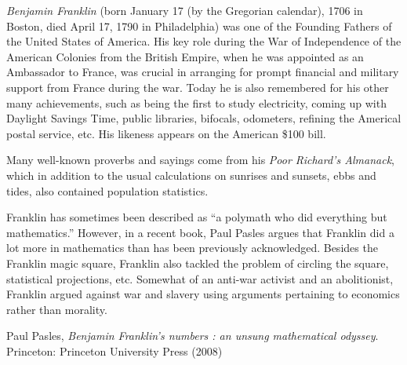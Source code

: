 \documentclass[12pt]{article}
\begin{document}
{\em Benjamin Franklin} (born January 17 (by the Gregorian calendar), 1706 in Boston, died April 17, 1790 in Philadelphia) was one of the Founding Fathers of the United States of America. His key role during the War of Independence of the American Colonies from the British Empire, when he was appointed as an Ambassador to France, was crucial in arranging for prompt financial and military support from France during the war.  Today he is also remembered for his other many achievements, such as being the first to study electricity, coming up with Daylight Savings Time, public libraries, bifocals, odometers, refining the Americal postal service, etc. His likeness appears on the American \$100 bill.

Many well-known proverbs and sayings come from his {\it Poor Richard's Almanack}, which in addition to the usual calculations on sunrises and sunsets, ebbs and tides, also contained population statistics.

Franklin has sometimes been described as ``a polymath who did everything but mathematics.'' However, in a recent book, Paul Pasles argues that Franklin did a lot more in mathematics than has been previously acknowledged. Besides the Franklin magic square, Franklin also tackled the problem of circling the square, statistical projections, etc. Somewhat of an anti-war activist and an abolitionist, Franklin argued against war and slavery using arguments pertaining to economics rather than morality.

\begin{thebibliography}{1}
 Paul Pasles, {\it Benjamin Franklin's numbers : an unsung mathematical odyssey}. Princeton: Princeton University Press (2008)
\end{thebibliography}
\end{document}
